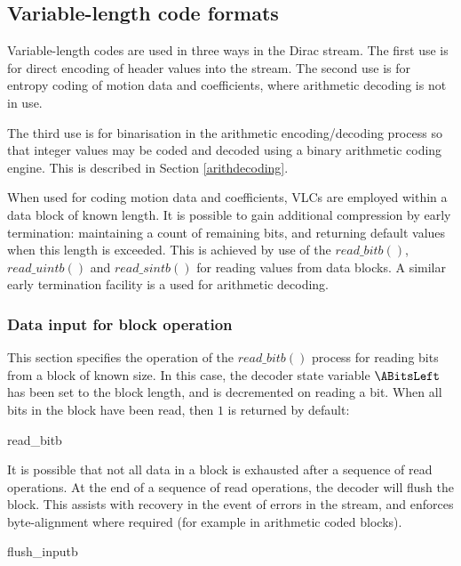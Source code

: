 \subsection{Variable-length code formats}
\label{vlc}
Variable-length codes are used in three ways in the Dirac stream. The first
use is for direct encoding of header values into the stream. The second use
is for entropy coding of motion data and coefficients, where arithmetic decoding
is not in use.

The third use 
is for binarisation in the arithmetic encoding/decoding process so that integer 
values may be coded and decoded using a binary arithmetic coding engine. This is
described in Section \ref{arithdecoding}.

When used for coding motion data and coefficients, VLCs are employed within
a data block of known length. It is possible to gain additional compression by early termination:
maintaining a count of remaining bits, and returning default values when this length
is exceeded. This is achieved by use of the $read\_bitb()$, $read\_uintb()$ and $read\_sintb()$
for reading values from data blocks. A similar early termination facility is a used for
arithmetic decoding.

\subsubsection{Data input for block operation}
\label{blockreadbit}

This section specifies the operation of the $read\_bitb()$ process for reading bits from
a block of known size. In this case, the decoder state variable $\ABitsLeft$ has been
set to the block length, and is decremented on reading a bit. When all bits in the block
have been read, then $1$ is returned by default:

\begin{pseudo}{read\_bitb}{}
\bsELSE
\bsEND
\end{pseudo}

It is possible that not all data in a block is exhausted after a sequence of read operations.
At the end of a sequence of read operations, the decoder will flush the block. This assists
with recovery in the event of errors in the stream, and enforces byte-alignment where required 
(for example in arithmetic coded blocks).

\begin{pseudo}{flush\_inputb}{}
\bsEND
\end{pseudo}


